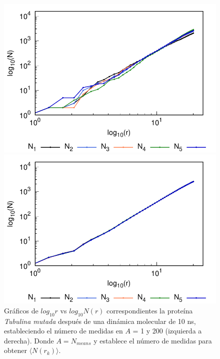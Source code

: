 		\begin{figure}[H]
		\hspace{-0.3cm} 
		\begin{minipage}{0.49\textwidth}
			\centering
			\includegraphics[width=\linewidth,page=1]{graphs/PDBs/Tubb4/TubMutA=1.pdf}
		\end{minipage}
		\hspace{0.2cm}
		\begin{minipage}{0.49\textwidth}
			\centering
			\includegraphics[width=\linewidth,page=1]{graphs/PDBs/Tubb4/TubMutA=200.pdf}
		\end{minipage}
		
		\caption{
			Gr\'{a}ficos de $log_{10}r$ vs $log_{10}N(r)$ correspondientes la proteína \textit{Tubulina mutada} despu\'{e}s de una din\'{a}mica molecular de 10 ns, estableciendo el número de medidas en  $A$ = 1 y 200 (izquierda a derecha). Donde $A = N_{means}$ y establece el número de medidas para obtener $\langle N(r_k) \rangle$.}
		\label{fig:Nmeasp}
		\end{figure}
		
